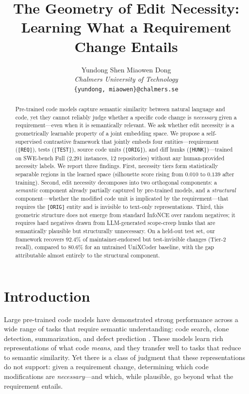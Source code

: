 \documentclass{article}
\title{The Geometry of Edit Necessity:\\
Learning What a Requirement Change Entails}
\author{
  Yundong Shen \quad Miaowen Dong \\
  \textit{Chalmers University of Technology} \\
  \texttt{\{yundong, miaowen\}@chalmers.se}
}
\newcommand{\REQ}{\texttt{[REQ]}}
\newcommand{\TEST}{\texttt{[TEST]}}
\newcommand{\ORIG}{\texttt{[ORIG]}}
\newcommand{\HUNK}{\texttt{[HUNK]}}
\begin{document}
\maketitle

\begin{abstract}
Pre-trained code models capture semantic similarity between natural language
and code, yet they cannot reliably judge whether a specific code change is
\emph{necessary} given a requirement---even when it is semantically relevant.
We ask whether edit necessity is a geometrically learnable property of a joint
embedding space.
We propose a self-supervised contrastive framework that jointly embeds four
entities---requirement (\REQ), tests (\TEST), source code units (\ORIG), and
diff hunks (\HUNK)---trained on SWE-bench Full (2{,}291 instances, 12
repositories) without any human-provided necessity labels.
We report three findings.
First, necessity tiers form statistically separable regions in the learned
space (silhouette score rising from $0.010$ to $0.139$ after training).
Second, edit necessity decomposes into two orthogonal components: a
\emph{semantic} component already partially captured by pre-trained models,
and a \emph{structural} component---whether the modified code unit is
implicated by the requirement---that requires the \ORIG{} entity and is
invisible to text-only representations.
Third, this geometric structure does not emerge from standard InfoNCE over
random negatives; it requires hard negatives drawn from LLM-generated
scope-creep hunks that are semantically plausible but structurally
unnecessary.
On a held-out test set, our framework recovers $92.4\%$ of maintainer-endorsed
but test-invisible changes (Tier-2 recall), compared to $80.6\%$ for an
untrained UniXCoder baseline, with the gap attributable almost entirely to the
structural component.
\end{abstract}

\section{Introduction}
\label{sec:intro}

Large pre-trained code models have demonstrated strong performance across a
wide range of tasks that require semantic understanding: code search, clone
detection, summarization, and defect prediction
\citep{feng2020codebert,guo2022unixcoder}.
These models learn rich representations of what code \emph{means}, and they
transfer well to tasks that reduce to semantic similarity.
Yet there is a class of judgment that these representations do not support:
given a requirement change, determining which code modifications are
\emph{necessary}---and which, while plausible, go beyond what the requirement
entails.
\end{document}
